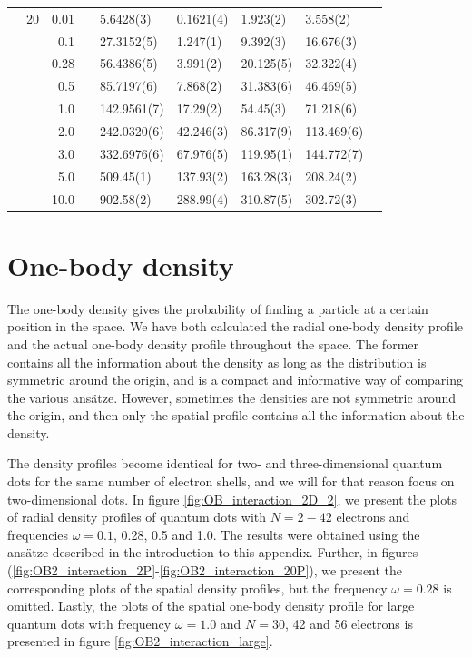 \begin{table}[H]
\begin{tabularx}{\textwidth}{R{1cm}rrcR{2.3cm}R{2.3cm}R{2.3cm}R{2.3cm}R{1cm}}
		&20 & 0.01 && 5.6428(3) & 0.1621(4) & 1.923(2) & 3.558(2) \\
		&& 0.1 && 27.3152(5) & 1.247(1) & 9.392(3) & 16.676(3) \\
		&& 0.28 && 56.4386(5) & 3.991(2) & 20.125(5) & 32.322(4) \\
		&& 0.5 && 85.7197(6) & 7.868(2) & 31.383(6) & 46.469(5) \\
		&& 1.0 && 142.9561(7) & 17.29(2) & 54.45(3) & 71.218(6) \\
		&& 2.0 && 242.0320(6) & 42.246(3) & 86.317(9) & 113.469(6) \\
		&& 3.0 && 332.6976(6) & 67.976(5) & 119.95(1) & 144.772(7) \\ 
		&& 5.0 && 509.45(1) & 137.93(2) & 163.28(3) & 208.24(2) \\
		&& 10.0 && 902.58(2) & 288.99(4) & 310.87(5) & 302.72(3) \\
		\hline \hline
	\end{tabularx}
\end{table}

\newpage
\section{One-body density} \label{sec:onebody}
The one-body density gives the probability of finding a particle at a certain position in the space. We have both calculated the radial one-body density profile and the actual one-body density profile throughout the space. The former contains all the information about the density as long as the distribution is symmetric around the origin, and is a compact and informative way of comparing the various ansätze. However, sometimes the densities are not symmetric around the origin, and then only the spatial profile contains all the information about the density. 

The density profiles become identical for two- and three-dimensional quantum dots for the same number of electron shells, and we will for that reason focus on two-dimensional dots. In figure \eqref{fig:OB_interaction_2D_2}, we present the plots of radial density  profiles of quantum dots with $N=2-42$ electrons and frequencies $\omega=0.1$, 0.28, 0.5 and 1.0. The results were obtained using the ansätze described in the introduction to this appendix. Further, in figures (\ref{fig:OB2_interaction_2P}-\ref{fig:OB2_interaction_20P}), we present the corresponding plots of the spatial density profiles, but the frequency $\omega=0.28$ is omitted. Lastly, the plots of the spatial one-body density profile for large quantum dots with frequency $\omega=1.0$ and $N=30$, 42 and 56 electrons is presented in figure \eqref{fig:OB2_interaction_large}. 

